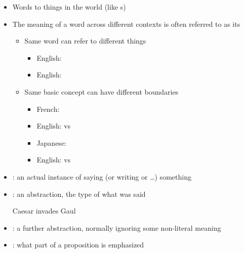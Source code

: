 \documentclass[a4paper,landscape,headrule,footrule,xetex,25pt]{foils}
\begin{document}
\begin{itemize}
\item Words  to things in the world (like s)
\item The meaning of a word across different contexts is often referred to as its 
  \begin{itemize}
  \item Same word can refer to different things
    \begin{itemize}
    \item English: 
    \item English: 
    \end{itemize}
  \item Same basic concept can have different boundaries
    \begin{itemize}
    \item French: 
    \item English:  vs 
      
    \item Japanese: 
    \item English:  vs 
    \end{itemize}
  \end{itemize}
\end{itemize}


\begin{itemize}
\item {}: an actual instance of saying (or writing  or \ldots) something
\item {}: an abstraction, the type of what was said
  \begin{exe}
    \ex Caesar invades Gaul
  \end{exe}
\item {}: a further abstraction, normally ignoring some non-literal meaning
  \begin{exe}
    \ex {}
  \end{exe}
\newpage
\item {}: what part of a proposition is emphasized
  \begin{exe}
   \ex {}
   \ex {}
   \ex {}
   \ex {}
  \end{exe}
\end{itemize}
\end{document}
